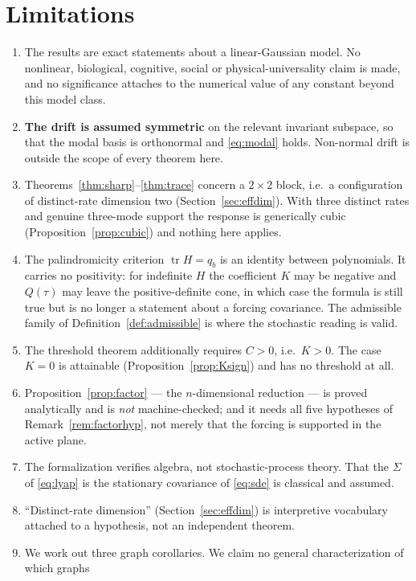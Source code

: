 \documentclass[11pt]{article}
\theoremstyle{plain}
\theoremstyle{definition}
\theoremstyle{remark}
\newcommand{\tr}{\operatorname{tr}}
\newcommand{\Sig}{\Sigma}
\begin{document}
\section{Limitations}\label{sec:limits}

\begin{enumerate}\itemsep3pt
\item The results are exact statements about a linear-Gaussian model. No nonlinear, biological,
  cognitive, social or physical-universality claim is made, and no significance attaches to the
  numerical value of any constant beyond this model class.
\item \textbf{The drift is assumed symmetric} on the relevant invariant subspace, so that the
  modal basis is orthonormal and \eqref{eq:modal} holds. Non-normal drift is outside the scope
  of every theorem here.
\item Theorems~\ref{thm:sharp}--\ref{thm:trace} concern a $2\times2$ block, i.e.\ a
  configuration of distinct-rate dimension two (Section~\ref{sec:effdim}). With three distinct
  rates and genuine three-mode support the response is generically cubic
  (Proposition~\ref{prop:cubic}) and nothing here applies.
\item The palindromicity criterion $\tr H=q_b$ is an identity between polynomials. It carries no
  positivity: for indefinite $H$ the coefficient $K$ may be negative and $Q(\tau)$ may leave the
  positive-definite cone, in which case the formula is still true but is no longer a statement
  about a forcing covariance. The admissible family of Definition~\ref{def:admissible} is where
  the stochastic reading is valid.
\item The threshold theorem additionally requires $C>0$, i.e.\ $K>0$. The case $K=0$ is
  attainable (Proposition~\ref{prop:Ksign}) and has no threshold at all.
\item Proposition~\ref{prop:factor} --- the $n$-dimensional reduction --- is proved analytically
  and is \emph{not} machine-checked; and it needs all five hypotheses of
  Remark~\ref{rem:factorhyp}, not merely that the forcing is supported in the active plane.
\item The formalization verifies algebra, not stochastic-process theory. That the $\Sig$ of
  \eqref{eq:lyap} is the stationary covariance of \eqref{eq:sde} is classical and assumed.
\item ``Distinct-rate dimension'' (Section~\ref{sec:effdim}) is interpretive vocabulary attached
  to a hypothesis, not an independent theorem.
\item We work out three graph corollaries. We claim no general characterization of which graphs

\end{enumerate}
\end{document}

